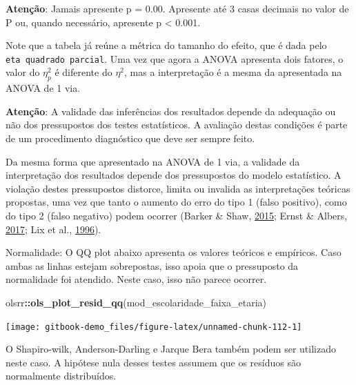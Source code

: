 \documentclass[
]{book}
\newenvironment{Shaded}{\begin{snugshade}}{\end{snugshade}}
\newcommand{\KeywordTok}[1]{\textcolor[rgb]{0.13,0.29,0.53}{\textbf{#1}}}
\newcommand{\NormalTok}[1]{#1}
\newcommand{\OperatorTok}[1]{\textcolor[rgb]{0.81,0.36,0.00}{\textbf{#1}}}
\begin{document}
\begin{warning}

\textbf{Atenção}: Jamais apresente p = 0.00. Apresente até 3 casas
decimais no valor de P ou, quando necessário, apresente p \textless{}
0.001.

\end{warning}

Note que a tabela já reúne a métrica do tamanho do efeito, que é dada
pelo \texttt{eta\ quadrado\ parcial}. Uma vez que agora a ANOVA
apresenta dois fatores, o valor do \(\eta_p^2\) é diferente do
\(\eta^2\), mas a interpretação é a mesma da apresentada na ANOVA de 1
via.

\begin{warning}

\textbf{Atenção}: A validade das inferências dos resultados depende da
adequação ou não dos pressupostos dos testes estatísticos. A avaliação
destas condições é parte de um procedimento diagnóstico que deve ser
sempre feito.

\end{warning}

Da mesma forma que apresentado na ANOVA de 1 via, a validade da
interpretação dos resultados depende dos pressupostos do modelo
estatístico. A violação destes pressupostos distorce, limita ou invalida
as interpretações teóricas propostas, uma vez que tanto o aumento do
erro do tipo 1 (falso positivo), como do tipo 2 (falso negativo) podem
ocorrer (Barker \& Shaw, \protect\hyperlink{ref-Barker2015}{2015}; Ernst
\& Albers, \protect\hyperlink{ref-Ernst2017}{2017}; Lix et al.,
\protect\hyperlink{ref-Lix1996}{1996}).

Normalidade: O QQ plot abaixo apresenta os valores teóricos e empíricos.
Caso ambas as linhas estejam sobrepostas, isso apoia que o pressuposto
da normalidade foi atendido. Neste caso, isso não parece ocorrer.

\begin{Shaded}
\begin{Highlighting}[]
\NormalTok{olsrr}\OperatorTok{::}\KeywordTok{ols_plot_resid_qq}\NormalTok{(mod_escolaridade_faixa_etaria)}
\end{Highlighting}
\end{Shaded}

\begin{center}\texttt{[image: gitbook-demo\_files/figure-latex/unnamed-chunk-112-1]} \end{center}

O Shapiro-wilk, Anderson-Darling e Jarque Bera também podem ser
utilizado neste caso. A hipótese nula desses testes assumem que os
resíduos são normalmente distribuídos.
\end{document}
